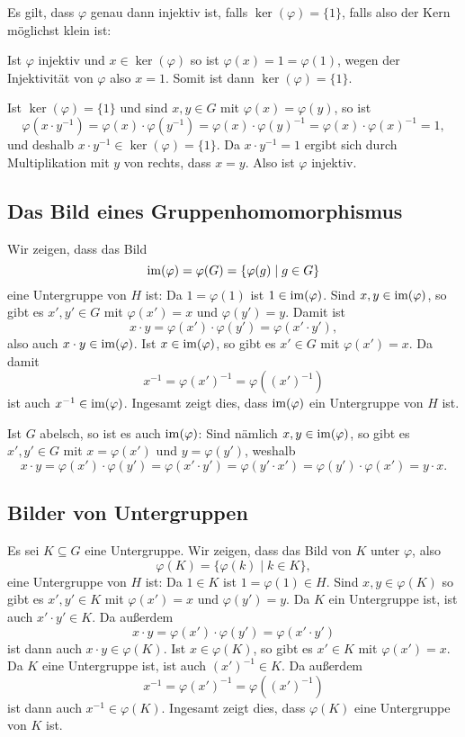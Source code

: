 \begin{bem}
 Es gilt, dass $\varphi$ genau dann injektiv ist, falls $\ker(\varphi) = \{1\}$, falls also der Kern möglichst klein ist:
 
 Ist $\varphi$ injektiv und $x \in \ker(\varphi)$ so ist $\varphi(x) = 1 = \varphi(1)$, wegen der Injektivität von $\varphi$ also $x = 1$. Somit ist dann $\ker(\varphi) = \{1\}$.
 
 Ist $\ker(\varphi) = \{1\}$ und sind $x,y \in G$ mit $\varphi(x) = \varphi(y)$, so ist
 \[
  \varphi(x\cdot y^{-1})
  = \varphi(x)\cdot \varphi(y^{-1})
  = \varphi(x) \cdot \varphi(y)^{-1}
  = \varphi(x) \cdot \varphi(x)^{-1}
  = 1,
 \]
 und deshalb $x \cdot y^{-1} \in \ker(\varphi) = \{1\}$. Da $x \cdot y^{-1} = 1$ ergibt sich durch Multiplikation mit $y$ von rechts, dass $x = y$. Also ist $\varphi$ injektiv.
\end{bem}



\subsection{Das Bild eines Gruppenhomomorphismus}
Wir zeigen, dass das Bild
\[
 \mathrm{im}(\varphi) = \varphi(G) = \{\varphi(g) \mid g \in G\}
\]
eine Untergruppe von $H$ ist: Da $1 = \varphi(1)$ ist $1 \in \mathrm{im}(\varphi)$. Sind $x,y \in \mathrm{im}(\varphi)$, so gibt es $x', y' \in G$ mit $\varphi(x') = x$ und $\varphi(y') = y$. Damit ist
\[
 x \cdot y
 = \varphi(x') \cdot \varphi(y')
 = \varphi(x' \cdot y'),
\]
also auch $x \cdot y \in \mathrm{im}(\varphi)$. Ist $x \in \mathrm{im}(\varphi)$, so gibt es $x' \in G$ mit $\varphi(x') = x$. Da damit
\[
 x^{-1}
 = \varphi(x')^{-1}
 = \varphi((x')^{-1})
\]
ist auch $x^{-1} \in \mathrm{im}(\varphi)$. Ingesamt zeigt dies, dass $\mathrm{im}(\varphi)$ ein Untergruppe von $H$ ist.

Ist $G$ abelsch, so ist es auch $\mathrm{im}(\varphi)$: Sind nämlich $x, y \in \mathrm{im}(\varphi)$, so gibt es $x', y' \in G$ mit $x = \varphi(x')$ und $y = \varphi(y')$, weshalb
\[
 x \cdot y
 = \varphi(x') \cdot \varphi(y')
 = \varphi(x' \cdot y')
 = \varphi(y' \cdot x')
 = \varphi(y') \cdot \varphi(x')
 = y \cdot x.
\]



\subsection{Bilder von Untergruppen}
Es sei $K \subseteq G$ eine Untergruppe. Wir zeigen, dass das Bild von $K$ unter $\varphi$, also
\[
 \varphi(K) = \{\varphi(k) \mid k \in K\},
\]
eine Untergruppe von $H$ ist: Da $1 \in K$ ist $1 = \varphi(1) \in H$. Sind $x,y \in \varphi(K)$ so gibt es $x', y' \in K$ mit $\varphi(x') = x$ und $\varphi(y') = y$. Da $K$ ein Untergruppe ist, ist auch $x' \cdot y' \in K$. Da außerdem
\[
 x \cdot y
 = \varphi(x') \cdot \varphi(y')
 = \varphi(x' \cdot y')
\]
ist dann auch $x \cdot y \in \varphi(K)$. Ist $x \in \varphi(K)$, so gibt es $x' \in K$ mit $\varphi(x') = x$. Da $K$ eine Untergruppe ist, ist auch $(x')^{-1} \in K$. Da außerdem
\[
 x^{-1}
 = \varphi(x')^{-1}
 = \varphi((x')^{-1})
\]
ist dann auch $x^{-1} \in \varphi(K)$. Ingesamt zeigt dies, dass $\varphi(K)$ eine Untergruppe von $K$ ist.

